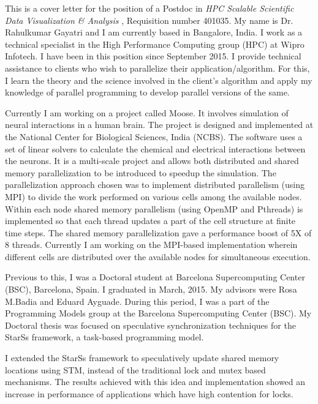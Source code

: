 \documentclass[10pt,stdletter,dateno]{newlfm}
\begin{document}
\begin{newlfm}
	   This is a cover letter for the position of a Postdoc in  {\it  HPC Scalable Scientific Data Visualization \& Analysis }, Requisition number 401035. 
	   My name is Dr. Rahulkumar Gayatri and I am currently based in Bangalore, India. 
	   I work as a technical specialist in the High Performance Computing group (HPC) at Wipro Infotech. 
	   I have been in this position since September 2015. 
	   I provide technical assistance to clients who wish to parallelize their application/algorithm.
	   For this, I learn the theory and the science involved in the client's algorithm and apply my knowledge of parallel programming to develop parallel versions of the same.
%	   
	   \par
	   Currently I am working on a project called Moose. It involves simulation of neural interactions in a human brain. 
	   The project is designed and implemented at the National Center for Biological Sciences, India (NCBS). 
	   The software uses a set of linear solvers to calculate the chemical and electrical interactions between the neurons. 
	   It is a multi-scale project and allows both distributed and shared memory parallelization to be introduced to speedup the simulation. 
	   The parallelization approach chosen was to implement distributed parallelism (using MPI) to divide the work performed on various cells among the available nodes. 
	   Within each node shared memory parallelism (using OpenMP and Pthreads) is implemented so that each thread updates a part of the cell structure at finite time steps.
	   The shared memory parallelization gave a performance boost of 5X of 8 threads. 
	   Currently I am working on the MPI-based implementation wherein different cells are distributed over the available nodes for simultaneous execution. 
%	   
	   \par
	   Previous to this, I was a Doctoral student at Barcelona Supercomputing Center (BSC), Barcelona, Spain. I graduated in March, 2015. 
	   My advisors were Rosa M.Badia and Eduard Ayguade.  
	   During this period, I was a part of the Programming Models group at the Barcelona Supercomputing Center (BSC). 
	   My Doctoral thesis was focused on speculative synchronization techniques for the StarSs framework, a task-based programming model.
%
	   \par
	   I extended the StarSs framework to speculatively update shared memory locations using STM, instead of the traditional lock and mutex based mechanisms.
	   The results achieved with this idea and implementation showed an increase in performance of applications which have high contention for locks. 

\end{newlfm}
\end{document}
